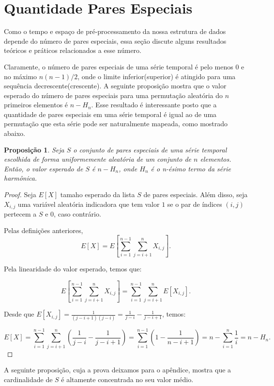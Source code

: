 \documentclass[12pt]{article}
\newtheorem{prop}[thm]{Proposição}
\begin{document}
\section{Quantidade Pares Especiais}

Como o tempo e espaço de pré-processamento da nossa estrutura de dados
depende do número de pares especiais, essa seção discute alguns resultados
teóricos e práticos relacionados a esse número.

Claramente, o número de pares especiais de uma série temporal é pelo 
menos $0$ e no máximo $n(n - 1)/2$, onde o limite inferior(superior) é
atingido para uma sequência decrescente(crescente). A seguinte proposição
mostra que o valor esperado do número de pares especiais para uma permutação
aleatória do $n$ primeiros elementos é $n - H_n$. Esse resultado é interessante
posto que a quantidade de pares especiais em uma série temporal é igual ao de 
uma permutação que esta série pode ser naturalmente mapeada, como mostrado abaixo.

\begin{prop}
Seja $S$ o conjunto de pares especiais de uma série 
temporal escolhida de forma uniformemente aleatória de um conjunto de $n$ elementos.
Então, o valor esperado de $S$ é $n - H_n$, onde $H_n$ é o n-ésimo termo 
da série harmônica.
\end{prop}
\begin{proof}
Seja $E[X]$ tamaho esperado da lista $S$ de pares especiais.
Além disso, seja $X_{i,j}$ uma variável aleatória indicadora que
tem valor $1$ se o par de índices $(i,j)$ pertecem a $S$ e $0$, caso contrário.

Pelas definições anteriores, 
$$E[X] = E[\sum\limits_{i=1}^{n-1} \sum\limits_{j=i+1}^{n}X_{i,j}].$$

Pela linearidade do valor esperado, temos que:

$$E[\sum\limits_{i=1}^{n-1} \sum\limits_{j=i+1}^{n}X_{i,j}] = \sum\limits_{i=1}^{n-1} \sum\limits_{j=i+1}^{n} E[X_{i,j}].$$

Desde que $E[X_{i,j}] = \frac{1}{(j-i+1)(j-i)} = \frac{1}{j-i} - \frac{1}{j-i+1}$, temos:

$$E[X] = \sum\limits_{i=1}^{n-1} \sum\limits_{j=i+1}^{n}
\left (\frac{1}{j-i} - \frac{1}{j-i+1} \right )
= \sum\limits_{i=1}^{n-1} \left (1 - \frac{1}{n-i+1} \right)
= n - \sum\limits_{i=1}^{n} \frac{1}{i}  =  n - H_n.$$
\end{proof}

A seguinte proposição, cuja a prova deixamos para o apêndice, mostra que 
a cardinalidade de $S$ é altamente concentrada no seu valor médio.
\end{document}
